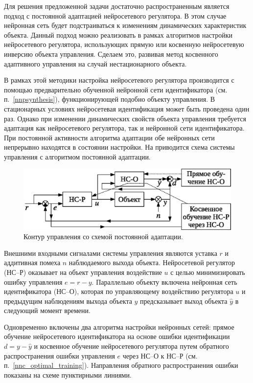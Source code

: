 Для решения предложенной задачи достаточно распространенным является
подход с постоянной адаптацией нейросетевого регулятора.  В этом
случае нейронная сеть будет подстраиваться к изменениям динамических
характеристик объекта.  Данный подход можно реализовать в рамках
алгоритмов настройки нейросетевого регулятора, использующих прямую или
косвенную нейросетевую инверсию объекта управления.  Сделаем это,
развивая метод косвенного адаптивного управления на случай
нестационарного объекта.

В рамках этой методики настройка нейросетевого регулятора производится
с помощью предварительно обученной нейронной сети идентификатора
(см. п.~\ref{nnpsynthesis}), функционирующей подобно объекту управления.  В
стационарных условиях нейросетевая идентификация может быть проведена
один раз.  Однако при изменении динамических свойств объекта
управления требуется адаптация как нейросетевого регулятора, так и
нейронной сети идентификатора.  При постоянной активности алгоритма
адаптации обе нейронных сети непрерывно находятся в состоянии
настройки.  На  приводится схема
системы управления с алгоритмом постоянной адаптации.

\begin{figure}[h]
\centering
\includegraphics{permanent_adoption_rus}
\caption{Контур управления со схемой постоянной адаптации.}
\label{fig:permanent_adoption_loop}
\end{figure}

Внешними входными сигналами системы управления являются уставка $r$ и
аддитивная помеха $n$ наблюдаемого выхода объекта.  Нейросетевой
регулятор (НС--Р) оказывает на объект управления воздействие $u$ с
целью минимизировать ошибку управления $e=r-y$.  Параллельно объекту
включена нейронная сеть идентификатора (НС--О), которая по управляющему
воздействию регулятора $u$ и предыдущим наблюдениям выхода объекта $y$
предсказывает выход объекта $\hat{y}$ в следующий момент времени.

Одновременно включены два алгоритма настройки нейронных сетей: прямое
обучение нейросетевого идентификатора на основе ошибки идентификации
$d=y-\hat{y}$ и косвенное обучение нейросетевого регулятора путем
обратного распространения ошибки управления $e$ через НС--О к НС--Р
(см. п.~\ref{nnc_optimal_training}).  Направления обратного
распространения ошибки показаны на схеме пунктирными линиями.

